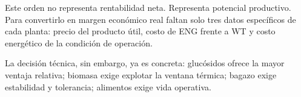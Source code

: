 Este orden no representa rentabilidad neta. Representa potencial productivo. Para
convertirlo en margen económico real faltan solo tres datos específicos de cada
planta: precio del producto útil, costo de ENG frente a WT y costo energético de
la condición de operación.

La decisión técnica, sin embargo, ya es concreta: glucósidos ofrece la mayor
ventaja relativa; biomasa exige explotar la ventana térmica; bagazo exige
estabilidad y tolerancia; alimentos exige vida operativa.
